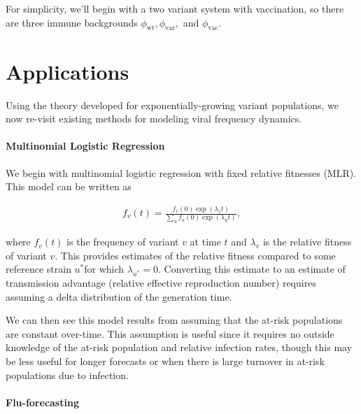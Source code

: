 \documentclass[12pt,oneside,letterpaper]{article}
\newcommand{\wt}{\text{wt}}
\newcommand{\var}{\text{var}}
\newcommand{\vac}{\text{vac}}
\begin{document}

For simplicity, we'll begin with a two variant system with vaccination, so there are three immune backgrounds $\phi_{\wt}, \phi_{\var},$ and $\phi_{\vac}$.


\section*{Applications}

Using the theory developed for exponentially-growing variant populations, we now re-visit existing methods for modeling viral frequency dynamics.

\paragraph{Multinomial Logistic Regression}%

We begin with multinomial logistic regression with fixed relative fitnesses (MLR).
This model can be written as

\begin{align*}
    f_{v}(t) = \frac{f_{v}(0) \exp(\lambda_{v} t)}{\sum_{u} f_{u}(0) \exp(\lambda_{u} t)},
\end{align*}

where $f_{v}(t)$ is the frequency of variant $v$ at time $t$ and $\lambda_{v}$ is the relative fitness of variant $v$.
This provides estimates of the relative fitness compared to some reference strain $u^{*}$for which $\lambda_{u^*} = 0$.
Converting this estimate to an estimate of transmission advantage (relative effective reproduction number) requires assuming a delta distribution of the generation time. \cite{Wallinga2006}

We can then see this model results from assuming that the at-risk populations are constant over-time.
This assumption is useful since it requires no outside knowledge of the at-risk population and relative infection rates, though this may be less useful for longer forecasts or when there is large turnover in at-risk populations due to infection.

\paragraph{Flu-forecasting}%
\end{document}
